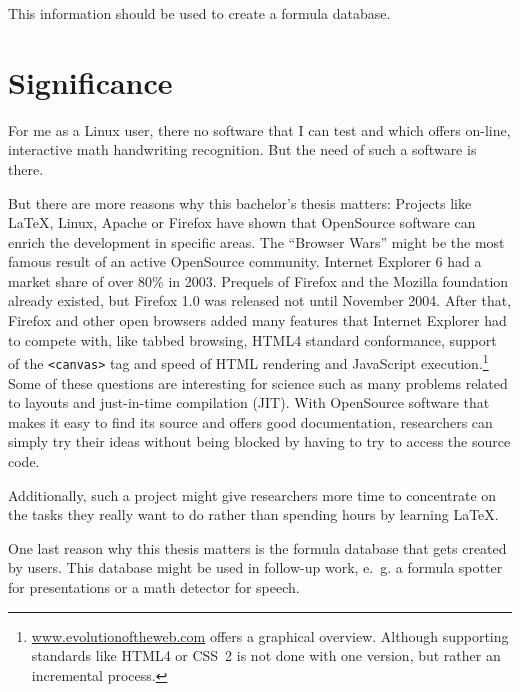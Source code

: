 \documentclass[a4paper]{scrartcl}
\begin{document}
    This information should be used to create a formula database.

\section{Significance}
For me as a Linux user, there no software that I can test and which
offers on-line, interactive math handwriting recognition. But the
need of such a software is there.

But there are more reasons why this bachelor's thesis matters:
Projects like \LaTeX{}, Linux, Apache or Firefox have shown that
OpenSource software can enrich the development in specific areas. The
\enquote{Browser Wars} might be the most famous result of an active
OpenSource community. Internet Explorer 6 had
a market share of over 80\% in 2003. Prequels of Firefox and the Mozilla
foundation already existed, but Firefox 1.0 was released not until
November 2004. After that, Firefox and other open browsers added many
features that Internet Explorer had to compete with, like tabbed browsing,
HTML4 standard conformance, support of the \texttt{<canvas>} tag and
speed of HTML rendering and JavaScript execution.\footnote{\href{http://www.evolutionoftheweb.com/}{www.evolutionoftheweb.com} offers a graphical overview. Although supporting standards like HTML4 or CSS~2 is not done with one version, but rather an incremental process.} Some of these
questions are interesting for science such as many problems related
to layouts and just-in-time compilation (JIT). With OpenSource software
that makes it easy to find its source and offers good documentation,
researchers can simply try their ideas without being blocked by
having to try to access the source code.

Additionally, such a project might give researchers more time to
concentrate on the tasks they really want to do rather than spending
hours by learning \LaTeX{}.

One last reason why this thesis matters is the formula database that
gets created by users. This database might be used in follow-up work,
e.~g. a formula spotter for presentations or a math detector for speech.
\end{document}
